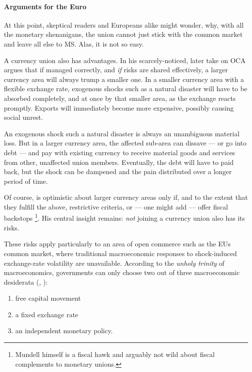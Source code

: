 \documentclass[11pt,a4paper,oneside,openright]{article}
\begin{document}

\paragraph{Arguments for the Euro} At this point, skeptical readers and Europeans alike might wonder, why, with all the monetary shenanigans, the union cannot just stick with the common market and leave all else to \gls{MS}. 
Alas, it is not so easy.

A currency union also has advantages. 
In his scarcely-noticed, later take on \gls{OCA} \cite{Mundell1972} argues that if managed correctly, and \emph{if} risks are shared effectively, a larger currency area will always trump a smaller one. 
In a smaller currency area with a flexible exchange rate, exogenous shocks such as a natural disaster will have to be absorbed completely, and at once by that smaller area, as the exchange reacts promptly. 
Exports will immediately become more expensive, possibly causing social unrest.

An exogenous shock such a natural disaster is always an unambiguous material loss. 
But in a larger currency area, the affected sub-area can dissave --- or go into debt --- and pay with existing currency to receive material goods and services from other, unaffected union members. 
Eventually, the debt will have to paid back, but the shock can be dampened and the pain distributed over a longer period of time.

Of course, \cite{Mundell1972} is optimistic about larger currency areas only if, and to the extent that they fulfill the above, restrictive criteria, or --- one might add --- offer fiscal backstops
\footnote{
	Mundell himself is a fiscal hawk and arguably not wild about fiscal complements to monetary unions.
}.
His central insight remains: 
\emph{not} joining a currency union also has its risks.

These risks apply particularly to an area of open commerce such as the \gls{EU}s common market, where traditional macroeconomic responses to shock-induced exchange-rate volatility are unavailable. 
According to the \emph{unholy trinity} of macroeconomics, governments can only choose two out of three macroeconomic desiderata (\citealt{Mundell1963}, \citealt{Fleming1962}):
\begin{enumerate}
	\item free capital movement
	\item a fixed exchange rate
	\item an independent monetary policy.
\end{enumerate}
\end{document}
